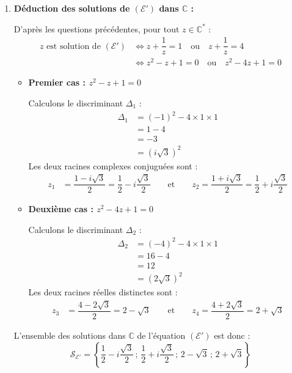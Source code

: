 \documentclass[12pt,a4paper]{article}
\begin{document}
\begin{enumerate}
    \item \textbf{Déduction des solutions de $(\mathcal{E}')$ dans $\mathbb{C}$ :}
    
    D'après les questions précédentes, pour tout $z \in \mathbb{C}^*$ :
    $$
    \begin{aligned}
        z \text{ est solution de } (\mathcal{E}') &\iff z + \dfrac{1}{z} = 1 \quad \text{ou} \quad z + \dfrac{1}{z} = 4 \\
        &\iff z^2 - z + 1 = 0 \quad \text{ou} \quad z^2 - 4z + 1 = 0
    \end{aligned}
    $$
    \begin{itemize}
        \item \textbf{Premier cas : $z^2 - z + 1 = 0$}
        
        Calculons le discriminant $\Delta_1$ :
        $$
        \begin{aligned}
            \Delta_1 &= (-1)^2 - 4 \times 1 \times 1 \\
            &= 1 - 4 \\
            &= -3 \\
            &= (i\sqrt{3})^2
        \end{aligned}
        $$
        Les deux racines complexes conjuguées sont :
        $$
        \begin{aligned}
            z_1 &= \dfrac{1 - i\sqrt{3}}{2} = \dfrac{1}{2} - i\dfrac{\sqrt{3}}{2} \qquad \text{et} \qquad z_2 = \dfrac{1 + i\sqrt{3}}{2} = \dfrac{1}{2} + i\dfrac{\sqrt{3}}{2}
        \end{aligned}
        $$

        \item \textbf{Deuxième cas : $z^2 - 4z + 1 = 0$}
        
        Calculons le discriminant $\Delta_2$ :
        $$
        \begin{aligned}
            \Delta_2 &= (-4)^2 - 4 \times 1 \times 1 \\
            &= 16 - 4 \\
            &= 12 \\
            &= (2\sqrt{3})^2
        \end{aligned}
        $$
        Les deux racines réelles distinctes sont :
        $$
        \begin{aligned}
            z_3 &= \dfrac{4 - 2\sqrt{3}}{2} = 2 - \sqrt{3} \qquad \text{et} \qquad z_4 = \dfrac{4 + 2\sqrt{3}}{2} = 2 + \sqrt{3}
        \end{aligned}
        $$
    \end{itemize}
    L'ensemble des solutions dans $\mathbb{C}$ de l'équation $(\mathcal{E}')$ est donc :
    $$
    \mathcal{S}_{\mathcal{E}'} = \left\{ \dfrac{1}{2} - i\dfrac{\sqrt{3}}{2} \,;\, \dfrac{1}{2} + i\dfrac{\sqrt{3}}{2} \,;\, 2 - \sqrt{3} \,;\, 2 + \sqrt{3} \right\}
    $$
\end{enumerate}
\end{document}
